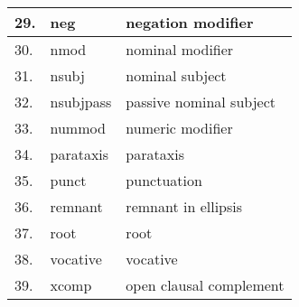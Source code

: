 \begin{table}[h]
\begin{tabular}{| l | l | l |}
29. & 	neg  & negation modifier \\ \hline
30. & 	nmod  & nominal modifier \\ \hline
31. & 	nsubj  & nominal subject \\ \hline
32. & 	nsubjpass  & passive nominal subject \\ \hline
33. & nummod  & numeric modifier \\ \hline
34. & 	parataxis  & parataxis  \\ \hline
35. & 	punct  & punctuation  \\ \hline
36. &  remnant  & remnant in ellipsis  \\ \hline
37. &  root  & root  \\ \hline
38. & 	vocative  & vocative  \\ \hline
39. & 	xcomp  & open clausal complement  \\ \hline
    \end{tabular}

\end{table}